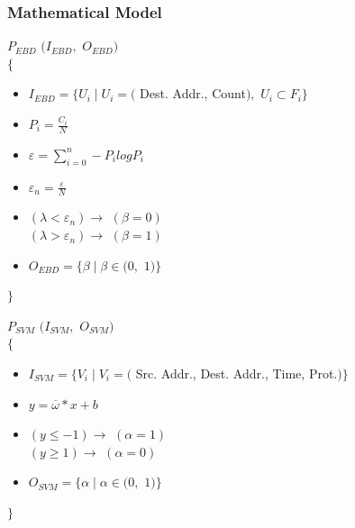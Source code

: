\documentclass[10pt]{beamer}
\begin{document}
\begin{frame}
\frametitle{Mathematical Model}
\footnotesize
$P_{EBD} $ $ (I_{EBD},$ $O_{EBD})$\\
$\lbrace$


\begin{itemize}
\footnotesize
\item $I_{EBD} = \lbrace U_{i} \mid U_{i} = ($ Dest. Addr., Count$),  $ $ U_{i}  \subset F_{i} \rbrace$

\item $P_{i} = \frac{C_{i}}{N}$  

\item $\varepsilon = \sum_{i=0}^{n} - P_{i} log P_{i}$

\item $\varepsilon_{n} = \frac{\varepsilon}{N} $

\item $(\lambda < \varepsilon_{n}) \rightarrow  $ $ (\beta = 0)$ \\ $(\lambda > \varepsilon_{n}) \rightarrow  $ $ (\beta = 1)$

\item $ O_{EBD} = \lbrace \beta \mid \beta \in (0, $ $1) \rbrace$
\end{itemize}
$ \rbrace$
\newline

$P_{SVM} $ $ (I_{SVM},$ $O_{SVM})$\\
$\lbrace$
\indent
\begin{itemize}
\footnotesize
\item $I_{SVM} = \lbrace V_{i} \mid V_{i} = ($ Src. Addr., Dest. Addr., Time, Prot.$) \rbrace$

\item $y = \overline{\omega} * x + b$ 

\item $(y \leq -1) \rightarrow  $ $ (\alpha = 1)$ \\ $(y \geq 1) \rightarrow  $ $ (\alpha = 0)$

\item $ O_{SVM} = \lbrace \alpha \mid \alpha \in (0, $ $1) \rbrace$
\end{itemize}
$ \rbrace$
\end{frame}
\end{document}
